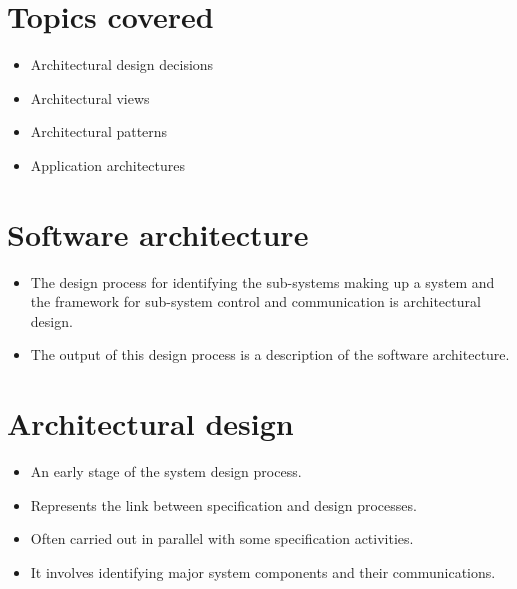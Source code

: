 \section{Topics covered}
\begin{itemize}
\item Architectural design decisions
\item Architectural views
\item Architectural patterns
\item Application architectures
\end{itemize}

\section{Software architecture}
\begin{itemize}
\item The design process for identifying the sub-systems making up a system and the framework for sub-system control and communication is architectural design.
\item The output of this design process is a description of the software architecture.
\end{itemize}

\section{Architectural design}
\begin{itemize}

\item An early stage of the system design process.

\item Represents the link between specification and design processes.

\item Often carried out in parallel with some specification activities.

\item It involves identifying major system components and their communications.

\end{itemize}
